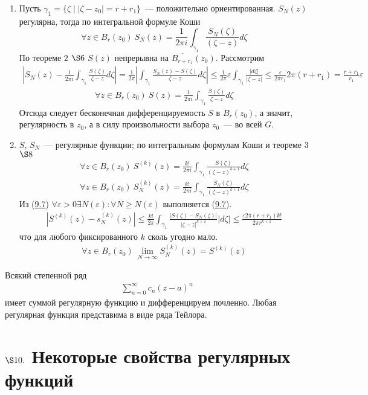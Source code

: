 \begin{enumerate}
    \item Пусть $\gamma_1 = \{\zeta \mid \left| \zeta - z_0 \right| =
    r+r_1\}$~--- положительно ориентированная.
    $S_N(z)$ регулярна, тогда по интегральной формуле Коши
    \begin{equation}\label{(9.9)}
        \forall z \in B_r(z_0) \ S_N(z) = \frac{1}{2 \pi i}\int_{\gamma_1}\frac{S_N(\zeta)}{(\zeta - z)}d \zeta
    \end{equation}
    По теореме $2$ $\S 6$ $S(z)$ непрерывна на $\overline{B_{r+r_1}}(z_0)$.
    Рассмотрим
    \begin{align*}
      \left| S_N(z) - \frac{1}{2 \pi i}\int_{\gamma_1}\frac{S(\zeta)}{\zeta - z} d\zeta \right| = \frac{1}{2 \pi}\left| \int_{\gamma_1} \frac{S_N(z) - S(\zeta)}{\zeta - z} d \zeta \right| \leq \frac{1}{2 \pi} \varepsilon \int_{\gamma_1}\frac{\left| d \zeta \right|}{\left| \zeta - z \right|} \leq \frac{\varepsilon}{2 \pi r_1}2 \pi (r+r_1) = \frac{r+r_1}{r_1}\varepsilon
    \end{align*}
    \begin{align*}
      \forall z \in B_r(z_0) \ S(z) = \frac{1}{2\pi i}\int_{\gamma_1}\frac{S(\zeta)}{\zeta - z}d\zeta
    \end{align*}
    Отсюда следует бесконечная дифференцируемость $S$ в $B_r(z_0)$, а значит,
    регулярность в $z_0$, а в силу произвольности выбора $z_0$~--- во всей $G$.
    \item $S$, $S_N$~--- регулярные функции; по интегральным формулам Коши и
    теореме $3$ $\S 8$
    \begin{align*}
      \forall z \in B_r(z_0) \ S^{(k)}(z) = \frac{k!}{2 \pi i} \int_{\gamma_1} \frac{S(\zeta)}{(\zeta - z)^{k+1}}d\zeta
    \end{align*}
    \begin{align*}
      \forall z \in B_r(z_0) \ S_N^{(k)}(z) = \frac{k!}{2 \pi i}\int_{\gamma_1}\frac{S_N(\zeta)}{(\zeta - z)^{k+1}} d \zeta 
    \end{align*}
    Из (\href{(9.7)}{9.7}) $\forall \varepsilon > 0 \exists N(\varepsilon):
    \forall N\geq N(\varepsilon)$ выполняется (\href{(9.7)}{9.7}).
    \begin{align*}
      \left| S^{(k)}(z) - s_N^{(k)}(z) \right| \leq \frac{k!}{2\pi}\int_{\gamma_1}\frac{\left| S(\zeta) - S_N(\zeta) \right|}{\left| \zeta - z \right|^{k+1}} \left| d\zeta \right|\leq \frac{\varepsilon 2 \pi (r+r_1)k!}{2 \pi r^{k+1}}
    \end{align*}
    что для любого фиксированного $k$ сколь угодно мало.
    \begin{align*}
      \forall z \in B_r(z_0) \ \lim_{N \to \infty}S^{(k)}_N (z) = S^{(k)}(z)
    \end{align*}
\end{enumerate}
\corollary
Всякий степенной ряд
\begin{align*}
  \sum_{n=0}^{\infty}c_n(z-a)^n
\end{align*}
имеет суммой регулярную функцию и дифференцируем почленно.
\corollary
Любая регулярная функция представима в виде ряда Тейлора.
\section{$\S 10.$ Некоторые свойства регулярных функций}
